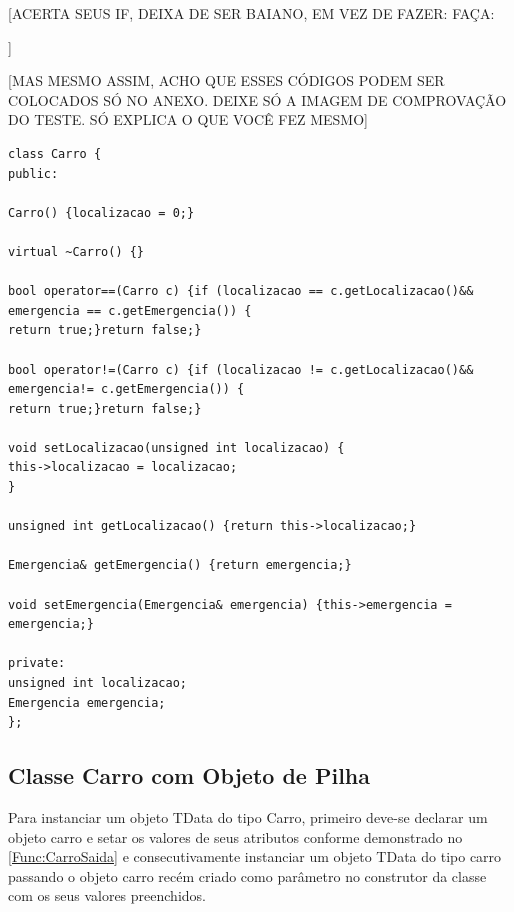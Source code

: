 \newpage

[ACERTA SEUS IF, DEIXA DE SER BAIANO, EM VEZ DE FAZER: 
FAÇA:

]

[MAS MESMO ASSIM, ACHO QUE ESSES CÓDIGOS PODEM SER COLOCADOS SÓ NO ANEXO. DEIXE SÓ A IMAGEM DE COMPROVAÇÃO DO TESTE. SÓ EXPLICA O QUE VOCÊ FEZ MESMO]

\begin{lstlisting}[label=Func:Carro,caption={[[Classe Carro sem ponteiro.] Neste quadro é mostrado um exemplo da classe Carro sem a utilização de ponteiros.}]
class Carro {
public:

Carro() {localizacao = 0;}

virtual ~Carro() {}

bool operator==(Carro c) {if (localizacao == c.getLocalizacao()&& emergencia == c.getEmergencia()) {
return true;}return false;}

bool operator!=(Carro c) {if (localizacao != c.getLocalizacao()&& emergencia!= c.getEmergencia()) {
return true;}return false;}

void setLocalizacao(unsigned int localizacao) {
this->localizacao = localizacao;
}

unsigned int getLocalizacao() {return this->localizacao;}

Emergencia& getEmergencia() {return emergencia;}

void setEmergencia(Emergencia& emergencia) {this->emergencia = emergencia;}

private:
unsigned int localizacao;
Emergencia emergencia;
};

\end{lstlisting}


\subsection{Classe Carro com Objeto de Pilha} \label{subsec:classeObjetoPilha}

Para instanciar um objeto TData do tipo Carro, primeiro deve-se declarar um objeto carro e setar os valores de seus atributos conforme demonstrado no \autoref{Func:CarroSaida} e consecutivamente instanciar um objeto TData do tipo carro passando o objeto carro recém criado como parâmetro no construtor da classe com os seus valores preenchidos. 

